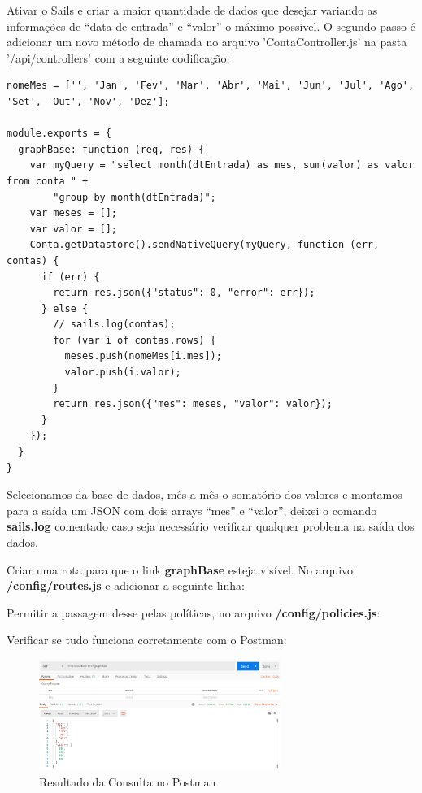 \documentclass[a4paper,11pt]{article}
\begin{document}
Ativar o Sails e criar a maior quantidade de dados que desejar variando as informações de ``data de entrada'' e ``valor'' o máximo possível. O segundo passo é adicionar um novo método de chamada no arquivo 'ContaController.js' na pasta '/api/controllers' com a seguinte codificação:
\begin{lstlisting}
nomeMes = ['', 'Jan', 'Fev', 'Mar', 'Abr', 'Mai', 'Jun', 'Jul', 'Ago', 'Set', 'Out', 'Nov', 'Dez'];

module.exports = {
  graphBase: function (req, res) {
    var myQuery = "select month(dtEntrada) as mes, sum(valor) as valor from conta " +
        "group by month(dtEntrada)";
    var meses = [];
    var valor = [];
    Conta.getDatastore().sendNativeQuery(myQuery, function (err, contas) {
      if (err) {
        return res.json({"status": 0, "error": err});
      } else {
        // sails.log(contas);
        for (var i of contas.rows) {
          meses.push(nomeMes[i.mes]);
          valor.push(i.valor);
        }
        return res.json({"mes": meses, "valor": valor});
      }
    });
  }
}
\end{lstlisting}

Selecionamos da base de dados, mês a mês o somatório dos valores e montamos para a saída um JSON com dois arrays ``mes'' e ``valor'', deixei o comando \textbf{sails.log} comentado caso seja necessário verificar qualquer problema na saída dos dados.

Criar uma rota para que o link \textbf{graphBase} esteja visível. No arquivo \textbf{/config/routes.js} e adicionar a seguinte linha: \\

Permitir a passagem desse pelas políticas, no arquivo \textbf{/config/policies.js}: \\

Verificar se tudo funciona corretamente com o Postman:
\begin{figure}[H]
	\centering
	\includegraphics[width=0.7\textwidth]{imagens/postmanFinal.png}
	\caption{Resultado da Consulta no Postman}
\end{figure}
\end{document}
